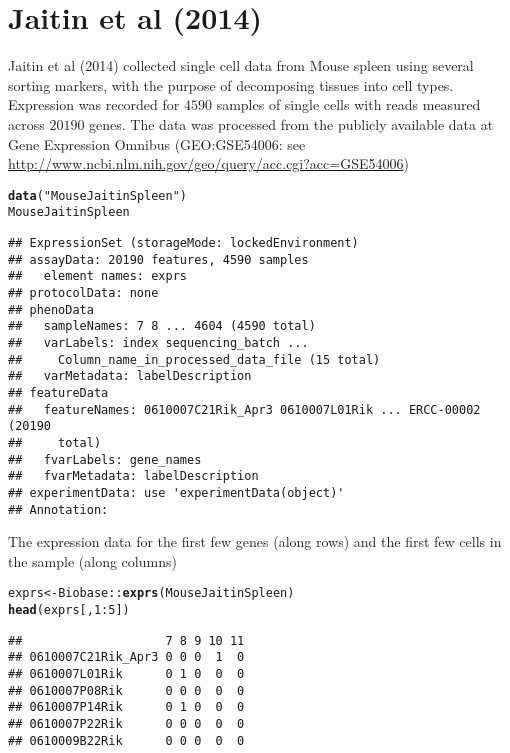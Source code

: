 \documentclass[12pt]{article}\usepackage[]{graphicx}\usepackage[usenames,dvipsnames]{color}
\makeatletter
\newcommand{\hlnum}[1]{\textcolor[rgb]{0.686,0.059,0.569}{#1}}%
\newcommand{\hlstr}[1]{\textcolor[rgb]{0.192,0.494,0.8}{#1}}%
\newcommand{\hlopt}[1]{\textcolor[rgb]{0,0,0}{#1}}%
\newcommand{\hlstd}[1]{\textcolor[rgb]{0.345,0.345,0.345}{#1}}%
\newcommand{\hlkwb}[1]{\textcolor[rgb]{0.69,0.353,0.396}{#1}}%
\newcommand{\hlkwd}[1]{\textcolor[rgb]{0.737,0.353,0.396}{\textbf{#1}}}%
\newenvironment{kframe}{%
 \def\at@end@of@kframe{}%
 \ifinner\ifhmode%
  \def\at@end@of@kframe{\end{minipage}}%
  \begin{minipage}{\columnwidth}%
 \fi\fi%
 \def\FrameCommand##1{\hskip\@totalleftmargin \hskip-\fboxsep
 \colorbox{shadecolor}{##1}\hskip-\fboxsep
     \hskip-\linewidth \hskip-\@totalleftmargin \hskip\columnwidth}%
 \MakeFramed {\advance\hsize-\width
   \@totalleftmargin\z@ \linewidth\hsize
   \@setminipage}}%
 {\par\unskip\endMakeFramed%
 \at@end@of@kframe}
\newenvironment{knitrout}{}{} %
\makeatother
\begin{document}
\section{Jaitin et al (2014)}

Jaitin et al (2014) \cite{Jaitin2014} collected single cell data from Mouse spleen using several sorting markers, with the purpose of decomposing tissues into cell types. Expression was recorded for $4590$ samples of single cells with reads measured across $20190$ genes. The data
was processed from the publicly available data at Gene Expression Omnibus (GEO:GSE54006: see \url{http://www.ncbi.nlm.nih.gov/geo/query/acc.cgi?acc=GSE54006})

\begin{knitrout}
\color{fgcolor}\begin{kframe}
\begin{alltt}
\hlkwd{data}\hlstd{(}\hlstr{"MouseJaitinSpleen"}\hlstd{)}
\hlstd{MouseJaitinSpleen}
\end{alltt}
\begin{verbatim}
## ExpressionSet (storageMode: lockedEnvironment)
## assayData: 20190 features, 4590 samples 
##   element names: exprs 
## protocolData: none
## phenoData
##   sampleNames: 7 8 ... 4604 (4590 total)
##   varLabels: index sequencing_batch ...
##     Column_name_in_processed_data_file (15 total)
##   varMetadata: labelDescription
## featureData
##   featureNames: 0610007C21Rik_Apr3 0610007L01Rik ... ERCC-00002 (20190
##     total)
##   fvarLabels: gene_names
##   fvarMetadata: labelDescription
## experimentData: use 'experimentData(object)'
## Annotation:
\end{verbatim}
\end{kframe}
\end{knitrout}

The expression data for the first few genes (along rows) and the first few
cells in the sample (along columns)

\begin{knitrout}
\color{fgcolor}\begin{kframe}
\begin{alltt}
\hlstd{exprs} \hlkwb{<-} \hlstd{Biobase}\hlopt{::}\hlkwd{exprs}\hlstd{(MouseJaitinSpleen)}
\hlkwd{head}\hlstd{(exprs[,}\hlnum{1}\hlopt{:}\hlnum{5}\hlstd{])}
\end{alltt}
\begin{verbatim}
##                    7 8 9 10 11
## 0610007C21Rik_Apr3 0 0 0  1  0
## 0610007L01Rik      0 1 0  0  0
## 0610007P08Rik      0 0 0  0  0
## 0610007P14Rik      0 1 0  0  0
## 0610007P22Rik      0 0 0  0  0
## 0610009B22Rik      0 0 0  0  0
\end{verbatim}
\end{kframe}
\end{knitrout}
\end{document}
